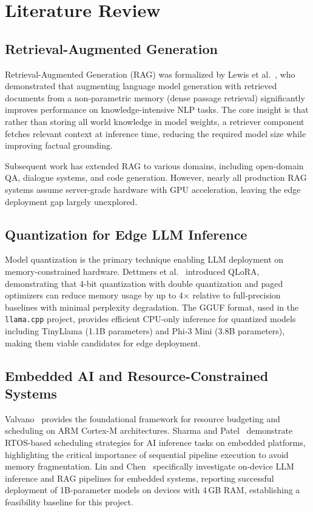 \documentclass[10pt,twocolumn]{article}
\begin{document}
\section{Literature Review}
\label{sec:litreview}

\subsection{Retrieval-Augmented Generation}

Retrieval-Augmented Generation (RAG) was formalized by Lewis et al.~\cite{Lewis2020RAG}, who demonstrated that augmenting language model generation with retrieved documents from a non-parametric memory (dense passage retrieval) significantly improves performance on knowledge-intensive NLP tasks. The core insight is that rather than storing all world knowledge in model weights, a retriever component fetches relevant context at inference time, reducing the required model size while improving factual grounding.

Subsequent work has extended RAG to various domains, including open-domain QA, dialogue systems, and code generation. However, nearly all production RAG systems assume server-grade hardware with GPU acceleration, leaving the edge deployment gap largely unexplored.

\subsection{Quantization for Edge LLM Inference}

Model quantization is the primary technique enabling LLM deployment on memory-constrained hardware. Dettmers et al.~\cite{Dettmers2022QLoRA} introduced QLoRA, demonstrating that 4-bit quantization with double quantization and paged optimizers can reduce memory usage by up to 4$\times$ relative to full-precision baselines with minimal perplexity degradation. The GGUF format, used in the \texttt{llama.cpp} project, provides efficient CPU-only inference for quantized models including TinyLlama (1.1B parameters) and Phi-3 Mini (3.8B parameters), making them viable candidates for edge deployment.

\subsection{Embedded AI and Resource-Constrained Systems}

Valvano~\cite{Valvano2017Embedded} provides the foundational framework for resource budgeting and scheduling on ARM Cortex-M architectures. Sharma and Patel~\cite{Sharma2020RTOS} demonstrate RTOS-based scheduling strategies for AI inference tasks on embedded platforms, highlighting the critical importance of sequential pipeline execution to avoid memory fragmentation. Lin and Chen~\cite{edgeai2023rag} specifically investigate on-device LLM inference and RAG pipelines for embedded systems, reporting successful deployment of 1B-parameter models on devices with 4\,GB RAM, establishing a feasibility baseline for this project.
\end{document}
